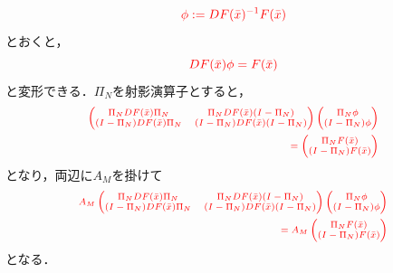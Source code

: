 \documentclass[11pt,a4paper,titlepage]{jsreport}
\theoremstyle{definition}
\providecommand{\DIFdel}[1]{{\protect\color{red} \scriptsize #1}} %
\begin{document}
\begin{displaymath}
  \DIFdel{\phi:=DF(\bar{x})^{-1} F(\bar{x})
}\end{displaymath}%
\DIFdel{とおくと，
}\begin{displaymath}
  \DIFdel{DF(\bar{x}) \phi = F(\bar{x})
}\end{displaymath}%
\DIFdel{と変形できる．$\Pi_N$を射影演算子とすると，
}\begin{displaymath}
    \DIFdel{\begin{split}
    \begin{pmatrix}
      \Pi_N DF(\bar{x}) \Pi_N & \Pi_N DF(\bar{x}) (I-\Pi_N) \\
      (I-\Pi_N) DF(\bar{x}) \Pi_N & (I-\Pi_N) DF(\bar{x}) (I-\Pi_N)
    \end{pmatrix}
    \begin{pmatrix}
      \Pi_N \phi \\
      (I-\Pi_N) \phi
    \end{pmatrix}
    \\=
    \begin{pmatrix}
      \Pi_N F(\bar{x}) \\
      (I - \Pi_N) F(\bar{x})
    \end{pmatrix}
  \end{split}
}\end{displaymath}%
\DIFdel{となり，両辺に$A_M$を掛けて
}\begin{displaymath}
  \DIFdel{%
  \begin{split}
  A_M
    \begin{pmatrix}
      \Pi_N DF(\bar{x}) \Pi_N & \Pi_N DF(\bar{x}) (I-\Pi_N) \\
      (I-\Pi_N) DF(\bar{x}) \Pi_N & (I-\Pi_N) DF(\bar{x}) (I-\Pi_N)
    \end{pmatrix}
    \begin{pmatrix}
      \Pi_N \phi \\
      (I-\Pi_N) \phi
    \end{pmatrix}
    \\=A_M
    \begin{pmatrix}
      \Pi_N F(\bar{x}) \\
      (I - \Pi_N) F(\bar{x})
    \end{pmatrix}
  \end{split}
}\end{displaymath}%
\DIFdel{となる．
}%
\end{document}
